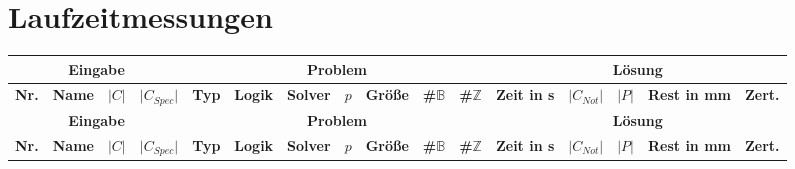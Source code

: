 \section{Laufzeitmessungen}
\label{appendix:results}
\begin{landscape}
    \begin{longtable}{|c|c|c|c|c|l|c|c|c|c|c|c|c|c|c|c|}
            \hline
            \multicolumn{4}{|c|}{\textbf{Eingabe}} & \multicolumn{7}{c|}{\textbf{Problem}} & \multicolumn{5}{c|}{\textbf{Lösung}} \\
            \hline
            \textbf{Nr.} & \textbf{Name} & \textbf{$\lvert C \rvert$} & \textbf{$\lvert C_{Spec} \rvert$} & \textbf{Typ} & \textbf{Logik} & \textbf{Solver} & \textbf{$p$} & \textbf{Größe} & \textbf{\#$\mathbb{B}$} & \textbf{\#$\mathbb{Z}$} & \textbf{Zeit in s} & \textbf{$\lvert C_{Not} \rvert$} & \textbf{$\lvert P \rvert$} & \textbf{Rest in mm} & \textbf{Zert.} \\
            \hline
            \endfirsthead

            \hline
            \multicolumn{4}{|c|}{\textbf{Eingabe}} & \multicolumn{7}{c|}{\textbf{Problem}} & \multicolumn{5}{c|}{\textbf{Lösung}} \\
            \hline
            \textbf{Nr.} & \textbf{Name} & \textbf{$\lvert C \rvert$} & \textbf{$\lvert C_{Spec} \rvert$} & \textbf{Typ} & \textbf{Logik} & \textbf{Solver} & \textbf{$p$} & \textbf{Größe} & \textbf{\#$\mathbb{B}$} & \textbf{\#$\mathbb{Z}$} & \textbf{Zeit in s} & \textbf{$\lvert C_{Not} \rvert$} & \textbf{$\lvert P \rvert$} & \textbf{Rest in mm} & \textbf{Zert.} \\
            \hline
            \endhead


\end{longtable}
\end{landscape}
